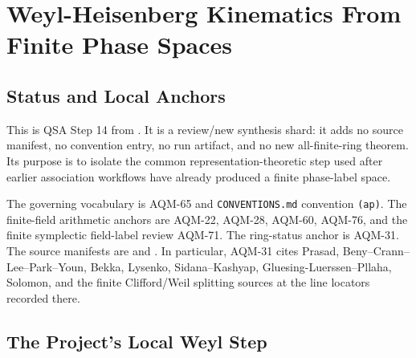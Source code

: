 
\section{Weyl-Heisenberg Kinematics From Finite Phase Spaces}
\label{sec:qsa-finite-phase-weyl-kinematics}

\subsection{Status and Local Anchors}

This is QSA Step 14 from
.  It is a review/new
synthesis shard: it adds no source manifest, no convention entry, no run
artifact, and no new all-finite-ring theorem.  Its purpose is to isolate the
common representation-theoretic step used after earlier association workflows
have already produced a finite phase-label space.

The governing vocabulary is AQM-65 and \texttt{CONVENTIONS.md} convention
\texttt{(ap)}.  The finite-field arithmetic anchors are AQM-22, AQM-28,
AQM-60, AQM-76, and the finite symplectic field-label review AQM-71.  The
ring-status anchor is AQM-31.  The source manifests are
 and
.  In particular, AQM-31 cites
Prasad, Beny--Crann--Lee--Park--Youn, Bekka, Lysenko,
Sidana--Kashyap, Gluesing-Luerssen--Pllaha, Solomon, and the finite
Clifford/Weil splitting sources at the line locators recorded there.

\subsection{The Project's Local Weyl Step}


